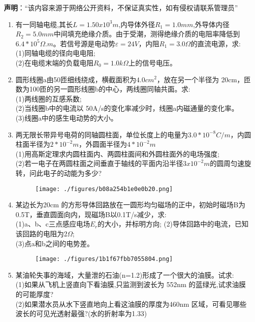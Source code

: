 
\textbf{声明}：“该内容来源于网络公开资料，不保证真实性，如有侵权请联系管理员”
\begin{enumerate}
\item 有一同轴电缆,其长$L=1.50x10^3m$,内导体外径$R_1=1.0mm$,外导体内径$R_2=5.0mm$中间填充绝缘介质。由于受潮，测得绝缘介质的电阻率降低到$6.4*10^5\Omega .m$。若信号源是电动势$\varepsilon=24V$，内阻$R_1=3.0\Omega$的直流电源，求:\\
(1)同轴电缆的径向电电阻;\\
(2)在电缆末端的负载电阻$R_0=1.0k \Omega$上的信号电压。
\item 圆形线圈a由50匝细线绕成，横截面积为$4.0cm^2$，放在另一个半径为 20cm，匝数为100匝的另一圆形线圈b的中心，两线圈同轴共面。求:\\
(1)两线圈的互感系数;\\
(2)当线圈b中的电流以 50A/s的变化率减少时，线圈a内磁通量的变化率。\\
(3)线圈a中的感生电动势的大小。
\item 两无限长带异号电荷的同轴圆柱面，单位长度上的电量为$3.0*10^{-8}C/m$，内圆柱面半径为$2*10^{-2}m$，外圆面半径为$4*10^{-2}m$\\
(1)用高斯定理求内圆柱面内、两圆柱面间和外圆柱面外的电场强度;\\
(2)若一电子在两圆柱面之间垂直于轴线的平面内沿半径$3x10^{-2}m$的圆周匀速旋转，问此电子的动能为多少?
\begin{figure}[ht]
\centering
\texttt{[image: ./figures/b08a254b1e0e0b20.png]}
\caption{} \label{fig_SD08_1}
\end{figure}
\item 某边长为20cm 的方形导体回路放在一圆形均匀磁场的正中，初始时磁场B为 0.5T，垂直圆面向内，现磁场B以0.1T/s减少，求:\\
(1)a、b、c三点感应电场$E_r$的大小，并标明方向;
(2)导体回路中的电流，已知该回路的电阻为2$\Omega$;\\
(3)点a和b之间的电势差。
\begin{figure}[ht]
\centering
\texttt{[image: ./figures/1b1f67fbb7055804.png]}
\caption{} \label{fig_SD08_2}
\end{figure}
\item 某油轮失事的海域，大量泄的石油(n=1.2)形成了一个很大的油膜。试求:\\
(1)如果从飞机上竖直向下看油膜,只监测到波长为 552nm 的蓝绿光,试求油膜的可能厚度?\\
(2)如果潜水员从水下竖直地向上看这油膜的厚度为460nm 区域，可看见哪些波长的可见光透射最强?(水的折射率为1.33)

\end{enumerate}

